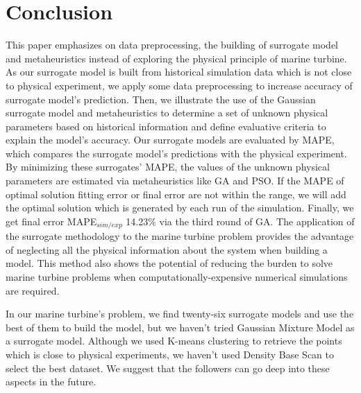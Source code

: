 \chapter{Conclusion}

This paper emphasizes on data preprocessing, the building of surrogate model and metaheuristics instead of exploring the physical principle of marine turbine. As our surrogate model is built from historical simulation data which is not close to physical experiment, we apply some data preprocessing to increase accuracy of surrogate model's prediction. Then, we illustrate the use of the Gaussian surrogate model and metaheuristics to determine a set of unknown physical parameters based on historical information and define evaluative criteria to explain the model's accuracy. Our surrogate models are evaluated by MAPE, which compares the surrogate model's predictions with the physical experiment. By minimizing these surrogates' MAPE, the values of the unknown physical parameters are estimated via metaheuristics like GA and PSO. If the MAPE of optimal solution fitting error or final error are not within the range, we will add the optimal solution which is generated by each run of the simulation. Finally, we get final error MAPE$_{sim/exp}$ 14.23${\%}$ via the third round of GA. The application of the surrogate methodology to the marine turbine problem provides the advantage of neglecting all the physical information about the system when building a model. This method also shows the potential of reducing the burden to solve marine turbine problems when computationally-expensive numerical simulations are required. 

In our marine turbine's problem, we find twenty-six surrogate models and use the best of them to build the model, but we haven't tried Gaussian Mixture Model as a surrogate model. Although we used K-means clustering to retrieve the points which is close to physical experiments, we haven't used Density Base Scan to select the best dataset. We suggest that the followers can go deep into these aspects in the future. 
